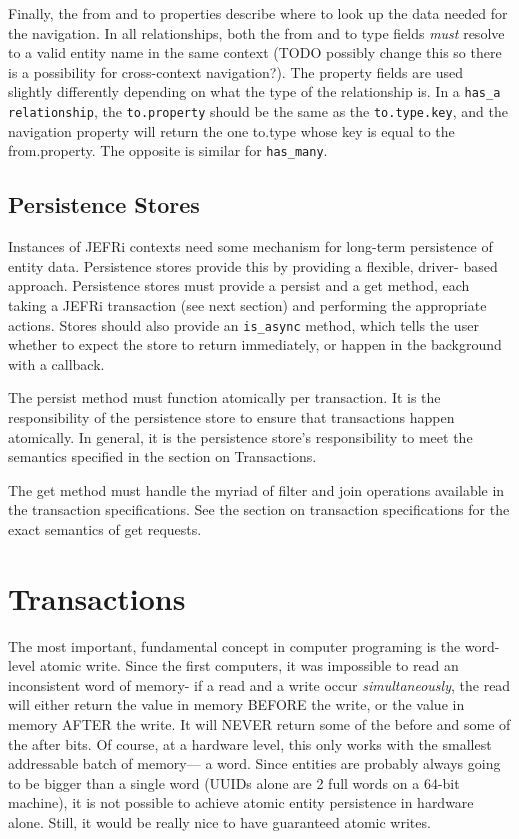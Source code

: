 \documentclass{article}
\newcommand{\ilcode}{\tt}
\begin{document}
Finally, the from and to properties describe where to look up the data needed
for the navigation. In all relationships, both the from and to type fields {\it
must} resolve to a valid entity name in the same context (TODO possibly change
this so there is a possibility for cross-context navigation?). The property
fields are used slightly differently depending on what the type of the
relationship is. In a {\ilcode has\_a relationship}, the {\ilcode to.property}
should be the same as the {\ilcode to.type.key}, and the navigation property
will return the one to.type whose key is equal to the from.property. The
opposite is similar for {\ilcode has\_many}.

\subsection{Persistence Stores}

Instances of JEFRi contexts need some mechanism for long-term persistence of
entity data. Persistence stores provide this by providing a flexible, driver-
based approach. Persistence stores must provide a persist and a get method, each
taking a JEFRi transaction (see next section) and performing the appropriate
actions. Stores should also provide an {\ilcode is\_async} method, which tells
the user whether to expect the store to return immediately, or happen in the
background with a callback.

The persist method must function atomically per transaction. It is the
responsibility of the persistence store to ensure that transactions happen
atomically. In general, it is the persistence store's responsibility to meet the
semantics specified in the section on Transactions.

The get method must handle the myriad of filter and join operations available in
the transaction specifications. See the section on transaction specifications
for the exact semantics of get requests.

\section{Transactions}

The most important, fundamental concept in computer programing is the word-level
atomic write. Since the first computers, it was impossible to read an
inconsistent word of memory- if a read and a write occur {\sl simultaneously},
the read will either return the value in memory BEFORE the write, or the value
in memory AFTER the write. It will NEVER return some of the before and some of
the after bits. Of course, at a hardware level, this only works with the
smallest addressable batch of memory--- a word. Since entities are probably
always going to be bigger than a single word (UUIDs alone are 2 full words on a
64-bit machine), it is not possible to achieve atomic entity persistence in
hardware alone. Still, it would be really nice to have guaranteed atomic writes.
\end{document}
